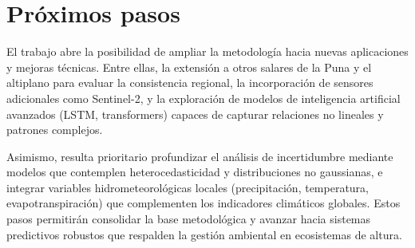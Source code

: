 
\section{Próximos pasos}

El trabajo abre la posibilidad de ampliar la metodología hacia nuevas aplicaciones y mejoras técnicas. Entre ellas, la extensión a otros salares de la Puna y el altiplano para evaluar la consistencia regional, la incorporación de sensores adicionales como Sentinel-2, y la exploración de modelos de inteligencia artificial avanzados (LSTM, transformers) capaces de capturar relaciones no lineales y patrones complejos. 

Asimismo, resulta prioritario profundizar el análisis de incertidumbre mediante modelos que contemplen heterocedasticidad y distribuciones no gaussianas, e integrar variables hidrometeorológicas locales (precipitación, temperatura, evapotranspiración) que complementen los indicadores climáticos globales. Estos pasos permitirán consolidar la base metodológica y avanzar hacia sistemas predictivos robustos que respalden la gestión ambiental en ecosistemas de altura.
